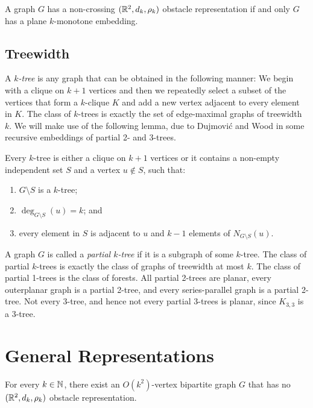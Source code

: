 \documentclass{patmorin}
\begin{document}
\begin{cor}
   A graph $G$ has a non-crossing $(\mathbb{R}^2,d_k,\rho_k)$ obstacle
   representation if and only $G$ has a plane $k$-monotone embedding.
\end{cor}

\subsection{Treewidth}

A \emph{$k$-tree} is any graph that can be obtained in the following
manner:  We begin with a clique on $k+1$ vertices and then we repeatedly
select a subset of the vertices that form a $k$-clique $K$ and add a
new vertex adjacent to every element in $K$.  The class of $k$-trees is
exactly the set of edge-maximal graphs of treewidth $k$.  We will make
use of the following lemma, due to Dujmovi\'c and Wood \cite[Lemma~Y]{X}
in some recursive embeddings of partial 2- and 3-trees.

\begin{lem}
   Every $k$-tree is either a clique on $k+1$ vertices or it contains a non-empty independent set $S$ and a vertex $u\not\in S$, such that:
\begin{enumerate}
   \item $G\setminus S$ is a $k$-tree;
   \item $\deg_{G\setminus S}(u)=k$; and 
   \item every element in $S$ is adjacent to $u$ and $k-1$ elements of
   $N_{G\setminus S}(u)$.
\end{enumerate}
\end{lem}

A graph $G$ is called a \emph{partial $k$-tree} if it is a subgraph of
some $k$-tree.  The class of partial $k$-trees is exactly the class of
graphs of treewidth at most $k$.  The class of partial 1-trees is the
class of forests.  All partial 2-trees are planar, every outerplanar graph
is a partial 2-tree, and every series-parallel graph is a partial 2-tree.
Not every 3-tree, and hence not every partial 3-trees is planar, since
$K_{3,3}$ is a 3-tree.

\section{General Representations}

\begin{thm}
  For every $k\in \mathbb{N}$, there exist an $O(k^2)$-vertex bipartite graph $G$ that
  has no $(\mathbb{R}^2,d_k,\rho_k)$ obstacle representation.
\end{thm}
\end{document}
